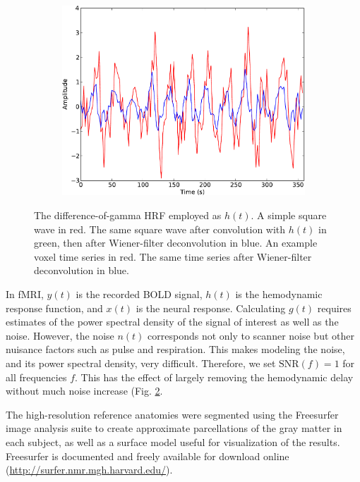 \documentclass[authoryear]{elsarticle}
\begin{document}
\begin{figure}
\begin{subfigure}{0.3\textwidth}
\includegraphics[width=\textwidth]{figures/voxel-wiener-deconvolution}
\caption{}
\label{fig:wiener-voxel}
\end{subfigure}
\caption{
 The difference-of-gamma HRF employed as $h(t)$. 
 A simple square wave in red. 
The same square wave after convolution with $h(t)$ in green, then after Wiener-filter deconvolution in blue. 
 An example voxel time series in red. 
The same time series after Wiener-filter deconvolution in blue.}
\label{fig:wiener-deconvolution}
\end{figure}

In fMRI, $y(t)$ is the recorded BOLD signal, $h(t)$ is the hemodynamic response function, and $x(t)$ is the neural response.
Calculating $g(t)$ requires estimates of the power spectral density of the signal of interest as well as the noise.
However, the noise $n(t)$ corresponds not only to scanner noise but other nuisance factors such as pulse and respiration.
This makes modeling the noise, and its power spectral density, very difficult.
Therefore, we set $\mbox{SNR}(f) = 1$ for all frequencies $f$. 
This has the effect of largely removing the hemodynamic delay without much noise increase (Fig. \ref{fig:wiener-deconvolution}.

The high-resolution reference anatomies were segmented using the Freesurfer image analysis suite to create approximate parcellations of the gray matter in each subject, as well as a surface model useful for visualization of the results.
Freesurfer is documented and freely available for download online (\url{http://surfer.nmr.mgh.harvard.edu/}).
\end{document}
